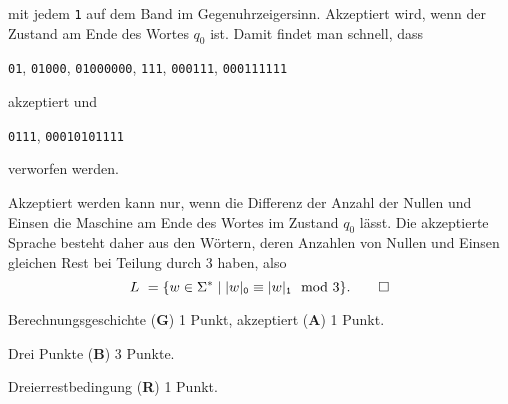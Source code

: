 \begin{loesung}
\begin{teilaufgaben}
mit jedem \texttt{1} auf dem Band im Gegenuhrzeigersinn.
Akzeptiert wird, wenn der Zustand am Ende des Wortes $q_0$ ist.
Damit findet man schnell, dass
\begin{center}
\texttt{01},
\texttt{01000},
\texttt{01000000},
\texttt{111},
\texttt{000111},
\texttt{000111111}
\end{center}
akzeptiert und
\begin{center}
\texttt{0111},
\texttt{00010101111}
\end{center}
verworfen werden.
\item
Akzeptiert werden kann nur, wenn die Differenz der Anzahl der Nullen und
Einsen die Maschine am Ende des Wortes im Zustand $q_0$ lässt.
Die akzeptierte Sprache besteht daher aus den Wörtern, deren Anzahlen
von Nullen und Einsen gleichen Rest bei Teilung durch 3 haben,
also
\[
L = \{
w\in\Sigma^*
\;|\;
|w|_{\texttt{0}} \equiv |w|_{\texttt{1}} \mod 3
\}.
\qedhere
\]
\end{teilaufgaben}
\end{loesung}

\begin{bewertung}
\begin{teilaufgaben}
\item 
Berechnungsgeschichte ({\bf G}) 1 Punkt,
akzeptiert ({\bf A}) 1 Punkt.
\item
Drei Punkte ({\bf B}) 3 Punkte.
\item
Dreierrestbedingung ({\bf R}) 1 Punkt.
\end{teilaufgaben}
\end{bewertung}
